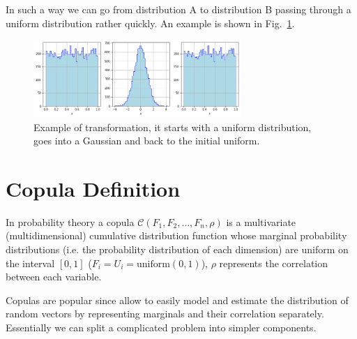 In such a way we can go from distribution A to distribution B passing through a uniform distribution rather quickly. An example is shown in Fig.~\ref{fig:a_to_b_to_a}.

\begin{figure}[htbp]
	\centering
	\includegraphics[width=0.7\textwidth]{figures/a_to_b_to_a}
	\caption{Example of transformation, it starts with a uniform distribution, goes into a Gaussian and back to the initial uniform.}
	\label{fig:a_to_b_to_a}
\end{figure}
\newpage

\section{Copula Definition}
\label{copula}




In probability theory a copula $\mathcal{C}(F_1, F_2, \ldots, F_n, \rho)$ is a multivariate (multidimensional) cumulative distribution function whose marginal probability distributions (i.e. the probability distribution of each dimension) are uniform on the interval $[0, 1]$ ($F_i = U_i =\mathrm{uniform}(0,1)$), \(\rho\) represents the correlation between each variable.

Copulas are popular since allow to easily model and estimate the distribution of random vectors by representing marginals and their correlation separately.
Essentially we can split a complicated problem into simpler components.

